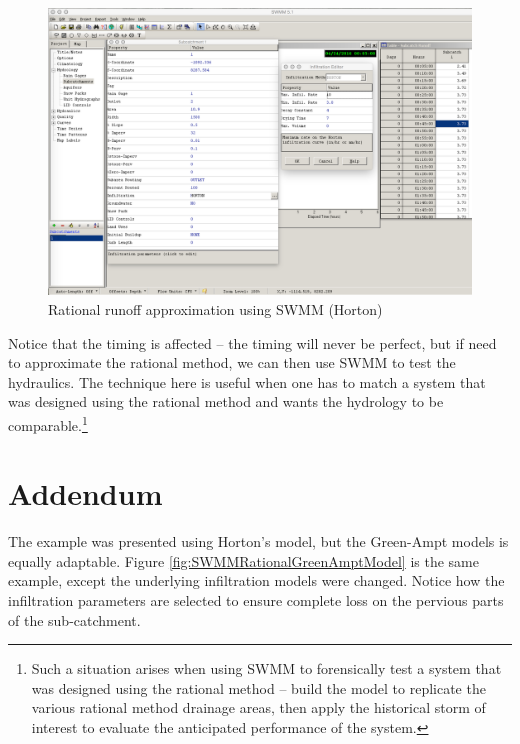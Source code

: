 \documentclass[12pt]{article}
\begin{document}
\begin{figure}[h!] %
   \centering
   \includegraphics[width=6in]{SWMMRationalWorkingModel.jpg} 
   \caption{Rational runoff approximation using SWMM (Horton) }
   \label{fig:SWMMRationalWorkingModel}
\end{figure}

Notice that the timing is affected -- the timing will never be perfect, but if need to approximate the rational method, we can then use SWMM to test the hydraulics.   
The technique here is useful when one has to match a system that was designed using the rational method and wants the hydrology to be comparable.\footnote{Such a situation arises when using SWMM to forensically test a system that was designed using the rational method -- build the model to replicate the various rational method drainage areas, then apply the historical storm of interest to evaluate the anticipated performance of the system.}
\clearpage

\section*{\small{Addendum}}
The example was presented using Horton's model, but the Green-Ampt models is equally adaptable.  Figure \ref{fig:SWMMRationalGreenAmptModel} is the same example, except the underlying infiltration models were changed.   Notice how the infiltration parameters are selected to ensure complete loss on the pervious parts of the sub-catchment.
\end{document}
